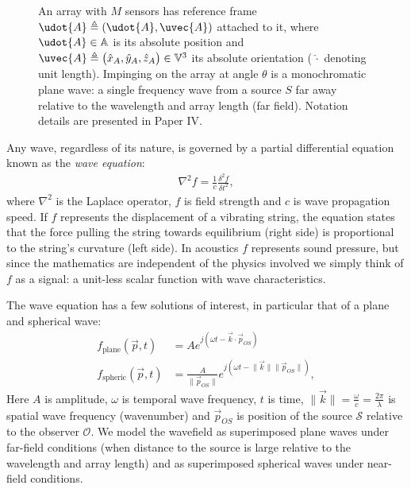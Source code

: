 {\begin{figure}[!t]\label{2_fig_geometry}\centering
{}
\caption{
An array with $M$ sensors has reference frame $\udot{A} \triangleq (\udot{A},\uvec{A})$ attached to it, where $\udot{A}\in\mathbb{A}$ is its absolute position and $\uvec{A}\triangleq\big(\hat{x}_{A},\hat{y}_{A},\hat{z}_{A}\big)\in\mathbb{V}^3$ its absolute orientation (\,$\hat{\cdot}$ denoting unit length). Impinging on the array at angle $\theta$ is a monochromatic plane wave: a single frequency wave from a source ${S}$ far away relative to the wavelength and array length (far field). Notation details are presented in Paper IV.
}
\end{figure}




Any wave, regardless of its nature, is governed by a partial differential equation known as the \emph{wave equation}:
%
\begin{align}
\nabla^2 f 
 = \frac{1}{c}\frac{\delta^2 f}{\delta t^2},
\end{align}
%
where $\nabla^2$ is the Laplace operator, $f$ is field strength and $c$ is wave propagation speed. If $f$ represents the displacement of a vibrating string, the equation states that the force pulling the string towards equilibrium (right side) is proportional to the string's curvature (left side). In acoustics $f$ represents sound pressure, but since the mathematics are independent of the physics involved we simply think of $f$ as a signal: a unit-less scalar function with wave characteristics.

The wave equation has a few solutions of interest, in particular that of a plane and spherical wave:
%
\begin{align}
f_\textrm{plane}(\vec{p},t)  &= A e^{j(\omega t - \vec{k} \cdot \vec{p}_{OS})} \\
f_\textrm{spheric}(\vec{p},t) &= \frac{A}{\lVert \vec{p}_{OS} \rVert} e^{j(\omega t - \lVert\vec{k}\rVert \lVert \vec{p}_{OS} \rVert)},
\end{align}
% 
Here $A$ is amplitude, $\omega$ is temporal wave frequency, $t$ is time, $\lVert\vec{k}\rVert=\frac{\omega}{c}=\frac{2\pi}{\lambda}$ is spatial wave frequency (wavenumber) and $\vec{p}_{OS}$ is position of the source $\mathcal{S}$ relative to the observer $\mathcal{O}$. We model the wavefield as superimposed plane waves under far-field conditions (when distance to the source is large relative to the wavelength and array length) and as superimposed spherical waves under near-field conditions. 

}
